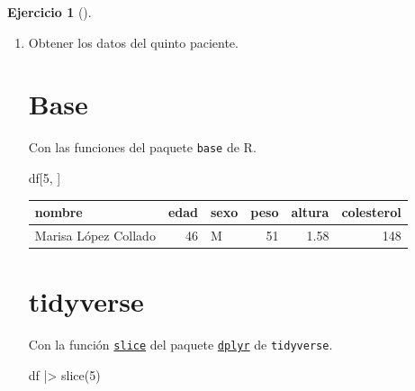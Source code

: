 \documentclass[
  spanish,
  a4paper,
]{scrreport}
\newenvironment{Shaded}{\begin{snugshade}}{\end{snugshade}}
\newcommand{\DecValTok}[1]{\textcolor[rgb]{0.68,0.00,0.00}{#1}}
\newcommand{\FunctionTok}[1]{\textcolor[rgb]{0.28,0.35,0.67}{#1}}
\newcommand{\NormalTok}[1]{\textcolor[rgb]{0.00,0.23,0.31}{#1}}
\newcommand{\SpecialCharTok}[1]{\textcolor[rgb]{0.37,0.37,0.37}{#1}}
\theoremstyle{definition}
\newtheorem{exercise}{Ejercicio}[chapter]
\theoremstyle{remark}
\begin{document}
\begin{exercise}[]
\begin{enumerate}
\begin{tcolorbox}
  \end{tcolorbox}
\item
  Obtener los datos del quinto paciente.

  \begin{tcolorbox}[enhanced jigsaw, colback=white, coltitle=black, toprule=.15mm, rightrule=.15mm, opacitybacktitle=0.6, opacityback=0, bottomtitle=1mm, toptitle=1mm, titlerule=0mm, breakable, leftrule=.75mm, title=\textcolor{quarto-callout-tip-color}{\faLightbulb}\hspace{0.5em}{Solución}, arc=.35mm, left=2mm, bottomrule=.15mm, colframe=quarto-callout-tip-color-frame, colbacktitle=quarto-callout-tip-color!10!white]

  \section{Base}

  Con las funciones del paquete \texttt{base} de R.

\begin{Shaded}
\begin{Highlighting}[]
\NormalTok{df[}\DecValTok{5}\NormalTok{, ]}
\end{Highlighting}
\end{Shaded}

  \begin{longtable}[]{@{}lrlrrr@{}}
  \toprule\noalign{}
  nombre & edad & sexo & peso & altura & colesterol \\
  \midrule\noalign{}
  \endhead
  \bottomrule\noalign{}
  \endlastfoot
  Marisa López Collado & 46 & M & 51 & 1.58 & 148 \\
  \end{longtable}

  \section{tidyverse}

  Con la función
  \href{https://dplyr.tidyverse.org/reference/slice.html}{\texttt{slice}}
  del paquete
  \href{https://dplyr.tidyverse.org/index.html}{\texttt{dplyr}} de
  \texttt{tidyverse}.

\begin{Shaded}
\begin{Highlighting}[]
\NormalTok{df }\SpecialCharTok{|\textgreater{}} \FunctionTok{slice}\NormalTok{(}\DecValTok{5}\NormalTok{)}
\end{Highlighting}
\end{Shaded}


\end{tcolorbox}
\end{enumerate}
\end{exercise}
\end{document}
